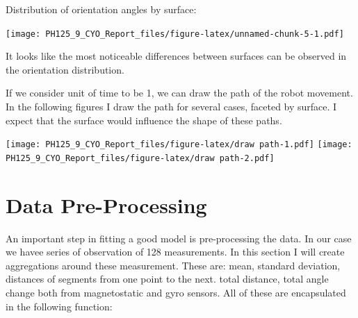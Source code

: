 \documentclass[]{article}
\begin{document}
Distribution of orientation angles by surface:

\texttt{[image: PH125\_9\_CYO\_Report\_files/figure-latex/unnamed-chunk-5-1.pdf]}

It looks like the most noticeable differences between surfaces can be
observed in the orientation distribution.

If we consider unit of time to be 1, we can draw the path of the robot
movement. In the following figures I draw the path for several cases,
faceted by surface. I expect that the surface would influence the shape
of these paths.

\texttt{[image: PH125\_9\_CYO\_Report\_files/figure-latex/draw path-1.pdf]}
\texttt{[image: PH125\_9\_CYO\_Report\_files/figure-latex/draw path-2.pdf]}

\hypertarget{data-pre-processing}{%
\section{Data Pre-Processing}\label{data-pre-processing}}

An important step in fitting a good model is pre-processing the data. In
our case we havee series of observation of 128 measurements. In this
section I will create aggregations around these measurement. These are:
mean, standard deviation, distances of segments from one point to the
next. total distance, total angle change both from magnetostatic and
gyro sensors. All of these are encapsulated in the following function:
\end{document}
